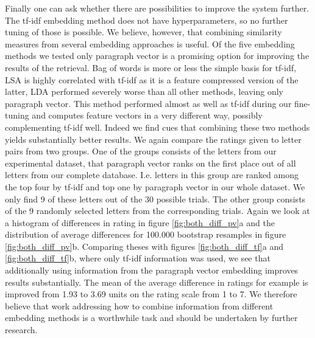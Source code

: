 Finally one can ask whether there are possibilities to improve the system further. The tf-idf embedding method does not have hyperparameters, so no further tuning of those is possible. We believe, however, that combining similarity measures from several embedding approaches is useful. Of the five embedding methods we tested only paragraph vector is a promising option for improving the results of the retrieval. Bag of words is more or less the simple basis for tf-idf, LSA is highly correlated with tf-idf as it is a feature compressed version of the latter, LDA performed severely worse than all other methods, leaving only paragraph vector. This method performed almost as well as tf-idf during our fine-tuning and computes feature vectors in a very different way, possibly complementing tf-idf well. Indeed we find cues that combining these two methods yields substantially better results. We again compare the ratings given to letter pairs from two groups. One of the groups consists of the letters from our experimental dataset, that paragraph vector ranks on the first place out of all letters from our complete database. I.e. letters in this group are ranked among the top four by tf-idf and top one by paragraph vector in our whole dataset. We only find 9 of these letters out of the 30 possible trials. The other group consists of the 9 randomly selected letters from the corresponding trials. Again we look at a histogram of differences in rating in figure \ref{fig:both_diff_pv}a and the distribution of average differences for 100.000 bootstrap resamples in figure \ref{fig:both_diff_pv}b. Comparing theses with figures \ref{fig:both_diff_tf}a and \ref{fig:both_diff_tf}b, where only tf-idf information was used, we see that additionally using information from the paragraph vector embedding improves results substantially. The mean of the average difference in ratings for example is improved from 1.93 to 3.69 units on the rating scale from 1 to 7. We therefore believe that work addressing how to combine information from different embedding methods is a worthwhile task and should be undertaken by further research.




